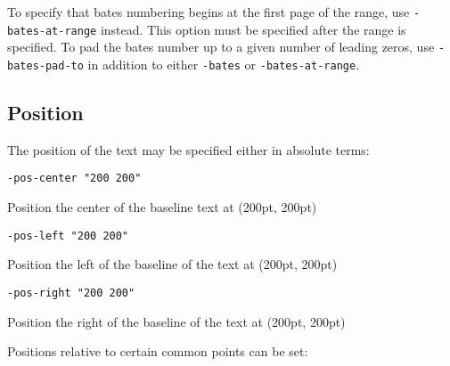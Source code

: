 \documentclass{book}
\begin{document}
\noindent To specify that bates numbering begins at the first page of the range, use \texttt{-bates-at-range} instead. This option must be specified after the range is specified. To pad the bates number up to a given number of leading zeros, use \texttt{-bates-pad-to} in addition to either \texttt{-bates} or \texttt{-bates-at-range}.



  \subsection{Position}
  \label{position}
  The position of the text may be specified either in absolute terms:
  \begin{framed}
    \small\verb!-pos-center "200 200"!
  
    \vspace{2.5mm}
    \noindent Position the center of the baseline text at (200pt, 200pt)

    \vspace{2.5mm}
    \small\verb!-pos-left "200 200"!
  
    \vspace{2.5mm}
    \noindent Position the left of the baseline of the text at (200pt, 200pt)

    \vspace{2.5mm}
    \small\verb!-pos-right "200 200"!
  
    \vspace{2.5mm}
    \noindent Position the right of the baseline of the text at (200pt, 200pt)

  \end{framed}

  \noindent Positions relative to certain common points can be set:
\end{document}
